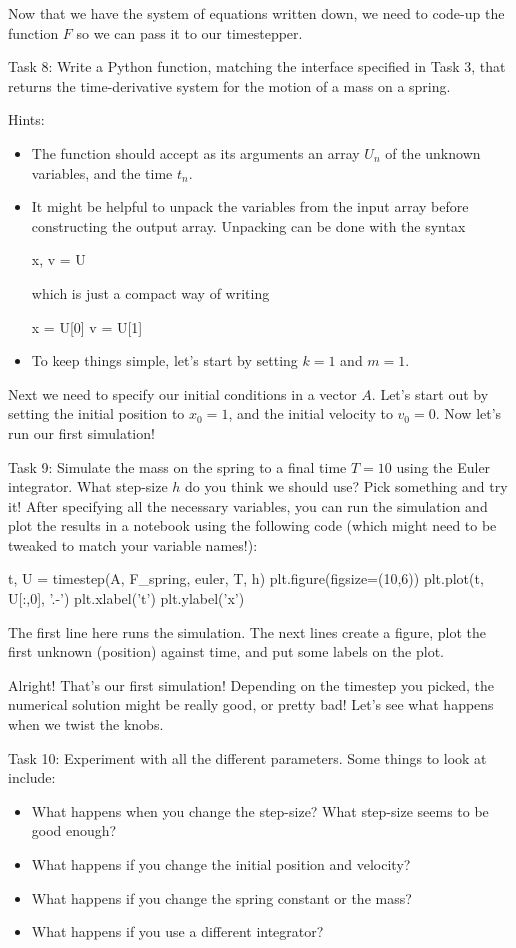 \documentclass[main.tex]{subfiles}
\begin{document}
Now that we have the system of equations written down, we need to code-up the function $F$ so we can pass it to our timestepper.

Task 8: Write a Python function, matching the interface specified in Task 3, that returns the time-derivative system for the motion of a mass on a spring.

Hints:
\begin{itemize}
\item The function should accept as its arguments an array $U_n$ of the unknown variables, and the time $t_n$.
\item It might be helpful to unpack the variables from the input array before constructing the output array.
Unpacking can be done with the syntax
\begin{python}
 x, v = U
\end{python}
which is just a compact way of writing
\begin{python}
 x = U[0]
 v = U[1]
\end{python}
\item To keep things simple, let's start by setting $k=1$ and $m=1$.
\end{itemize}

Next we need to specify our initial conditions in a vector $A$.
Let's start out by setting the initial position to $x_0=1$, and the initial velocity to $v_0=0$.
Now let's run our first simulation!

Task 9: 
Simulate the mass on the spring to a final time $T=10$ using the Euler integrator.
What step-size $h$ do you think we should use?
Pick something and try it!
After specifying all the necessary variables, you can run the simulation and plot the results in a notebook using the following code (which might need to be tweaked to match your variable names!):

\begin{python}
 t, U = timestep(A, F_spring, euler, T, h)
 plt.figure(figsize=(10,6))
 plt.plot(t, U[:,0], '.-')
 plt.xlabel('t')
 plt.ylabel('x')
\end{python}

The first line here runs the simulation.
The next lines create a figure, plot the first unknown (position) against time, and put some labels on the plot.

Alright!
That's our first simulation!
Depending on the timestep you picked, the numerical solution might be really good, or pretty bad!
Let's see what happens when we twist the knobs.

Task 10:
Experiment with all the different parameters.
Some things to look at include:
\begin{itemize}
\item What happens when you change the step-size?  What step-size seems to be good enough?
\item What happens if you change the initial position and velocity?
\item What happens if you change the spring constant or the mass?
\item What happens if you use a different integrator?
\end{itemize}
\end{document}
